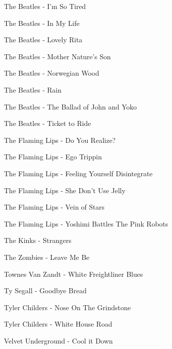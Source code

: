The Beatles - I'm So Tired \dotfill \pageref{I'm So Tired - The Beatles} 

The Beatles - In My Life \dotfill \pageref{In My Life - The Beatles} 

The Beatles - Lovely Rita \dotfill \pageref{Lovely Rita - The Beatles} 

The Beatles - Mother Nature's Son \dotfill \pageref{Mother Nature's Son - The Beatles} 

The Beatles - Norwegian Wood \dotfill \pageref{Norwegian Wood - The Beatles} 

The Beatles - Rain \dotfill \pageref{Rain - The Beatles} 

The Beatles - The Ballad of John and Yoko \dotfill \pageref{The Ballad of John and Yoko - The Beatles} 

The Beatles - Ticket to Ride \dotfill \pageref{Ticket to Ride - The Beatles} 

The Flaming Lips - Do You Realize? \dotfill \pageref{Do You Realize? - The Flaming Lips} 

The Flaming Lips - Ego Trippin \dotfill \pageref{Ego Trippin - The Flaming Lips} 

The Flaming Lips - Feeling Yourself Disintegrate \dotfill \pageref{Feeling Yourself Disintegrate - The Flaming Lips} 

The Flaming Lips - She Don't Use Jelly \dotfill \pageref{She Don't Use Jelly - The Flaming Lips} 

The Flaming Lips - Vein of Stars \dotfill \pageref{Vein of Stars - The Flaming Lips} 

The Flaming Lips - Yoshimi Battles The Pink Robots \dotfill \pageref{Yoshimi Battles The Pink Robots - The Flaming Lips} 

The Kinks - Strangers \dotfill \pageref{Strangers - The Kinks} 

The Zombies - Leave Me Be \dotfill \pageref{Leave Me Be - The Zombies} 

Townes Van Zandt - White Freightliner Blues \dotfill \pageref{White Freightliner Blues - Townes Van Zandt} 

Ty Segall - Goodbye Bread \dotfill \pageref{Goodbye Bread - Ty Segall} 

Tyler Childers - Nose On The Grindstone \dotfill \pageref{Nose On The Grindstone - Tyler Childers} 

Tyler Childers - White House Road \dotfill \pageref{White House Road - Tyler Childers} 

Velvet Underground - Cool it Down \dotfill \pageref{Cool it Down - Velvet Underground} 

